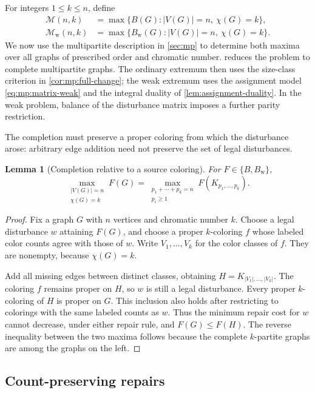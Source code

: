 \documentclass[11pt,reqno]{amsart}
\numberwithin{equation}{section}
\newtheorem{lemma}[theorem]{Lemma}
\theoremstyle{definition}
\theoremstyle{remark}
\begin{document}
For integers $1\le k\le n$, define
\begin{align*}
  \mathcal M(n,k)&=\max\{B(G): |V(G)|=n,\ \chi(G)=k\},\\
  \mathcal M_{\mathrm w}(n,k)
    &=\max\{B_{\mathrm w}(G): |V(G)|=n,\ \chi(G)=k\}.
\end{align*}
We now use the multipartite description in \cref{sec:mp} to determine
both maxima over all graphs of prescribed order and chromatic number.
 reduces the problem to complete multipartite
graphs. The ordinary extremum then uses the size-class criterion in
\cref{cor:mp:full-change}; the weak extremum uses the assignment model
\eqref{eq:mp:matrix-weak} and the integral duality of
\cref{lem:assignment-duality}. In the weak problem, balance of the
disturbance matrix imposes a further parity restriction.

The completion must preserve a proper coloring from which the
disturbance arose: arbitrary edge addition need not preserve the set
of legal disturbances.

\begin{lemma}[Completion relative to a source coloring]
\label{ext:completion}
For $F\in\{B,B_{\mathrm w}\}$,
\[
  \max_{\substack{|V(G)|=n\\ \chi(G)=k}}F(G)
   =\max_{\substack{p_1+\cdots+p_k=n\\p_i\ge1}}
      F(K_{p_1,\ldots,p_k}).
\]
\end{lemma}

\begin{proof}
Fix a graph $G$ with $n$ vertices and chromatic number $k$.  Choose a
legal disturbance $w$ attaining $F(G)$, and choose a proper $k$-coloring
$f$ whose labeled color counts agree with those of $w$.  Write
$V_1,\ldots,V_k$ for the color classes of $f$.  They are nonempty,
because $\chi(G)=k$.

Add all missing edges between distinct classes, obtaining
$H=K_{|V_1|,\ldots,|V_k|}$.  The coloring $f$ remains proper on $H$, so
$w$ is still a legal disturbance.  Every proper $k$-coloring of $H$ is
proper on $G$.  This inclusion also holds after restricting to colorings
with the same labeled counts as $w$.  Thus the minimum repair cost for
$w$ cannot decrease, under either repair rule, and $F(G)\le F(H)$.
The reverse inequality between the two maxima follows because the
complete $k$-partite graphs are among the graphs on the left.
\end{proof}

\subsection{Count-preserving repairs}
\end{document}
